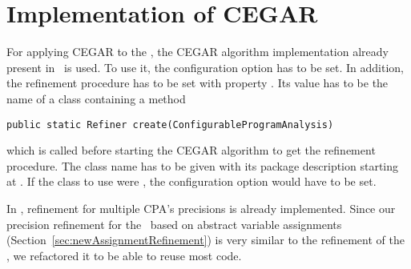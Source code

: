 \chapter{Implementation of CEGAR}
For applying CEGAR to the \symbolicExecutionCPA, the CEGAR algorithm implementation already present in \cpaChecker\ is used.
To use it, the configuration option  has to be set.
In addition, the refinement procedure has to be set with property .
Its value has to be the name of a class containing a method
\begin{lstlisting}
public static Refiner create(ConfigurableProgramAnalysis)
\end{lstlisting}
which is called before starting the CEGAR algorithm to get the refinement procedure.
The class name has to be given with its package description starting at
.
If the class to use were
,
the configuration option  would have to be set.

In \cpaChecker, refinement for multiple CPA's precisions is already implemented.
Since our precision refinement for the \symbolicExecutionCPA\ based on abstract variable assignments (Section~\ref{sec:newAssignmentRefinement}) is very similar to the refinement of the , we refactored it to be able to reuse most code.



